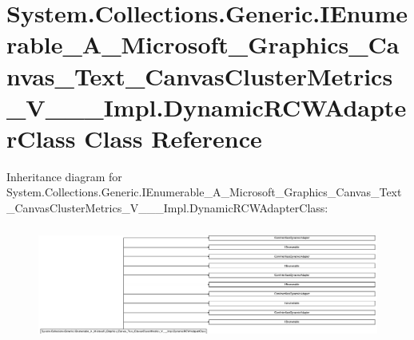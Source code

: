 \hypertarget{class_system_1_1_collections_1_1_generic_1_1_i_enumerable___a___microsoft___graphics___canvas___636cca1a007a9622ab798e2452b97028}{}\section{System.\+Collections.\+Generic.\+I\+Enumerable\+\_\+\+A\+\_\+\+Microsoft\+\_\+\+Graphics\+\_\+\+Canvas\+\_\+\+Text\+\_\+\+Canvas\+Cluster\+Metrics\+\_\+\+V\+\_\+\+\_\+\+\_\+\+Impl.\+Dynamic\+R\+C\+W\+Adapter\+Class Class Reference}
\label{class_system_1_1_collections_1_1_generic_1_1_i_enumerable___a___microsoft___graphics___canvas___636cca1a007a9622ab798e2452b97028}
Inheritance diagram for System.\+Collections.\+Generic.\+I\+Enumerable\+\_\+\+A\+\_\+\+Microsoft\+\_\+\+Graphics\+\_\+\+Canvas\+\_\+\+Text\+\_\+\+Canvas\+Cluster\+Metrics\+\_\+\+V\+\_\+\+\_\+\+\_\+\+Impl.\+Dynamic\+R\+C\+W\+Adapter\+Class\+:\begin{figure}[H]
\begin{center}
\leavevmode
\includegraphics[height=3.797781cm]{class_system_1_1_collections_1_1_generic_1_1_i_enumerable___a___microsoft___graphics___canvas___636cca1a007a9622ab798e2452b97028}
\end{center}
\end{figure}
